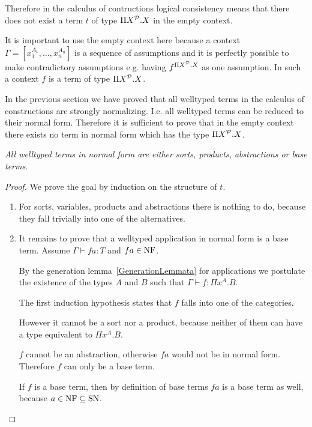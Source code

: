 Therefore in the calculus of contructions logical consistency means that there
does not exist a term $t$ of type $\Pi X^{\cal P}. X$ in the empty context.

It is important to use the empty context here because a context $\Gamma =
[x_1^{A_1}, \ldots, x_n^{A_n}]$ is a sequence of assumptions and it is perfectly
possible to make contradictory assumptions e.g. having $f^{\Pi X^{\cal P}. X}$ as
one assumption. In such a context $f$ is a term of type $\Pi X^{\cal P}. X$.

In the previous section we have proved that all welltyped terms in the calculus
of constructions are strongly normalizing. I.e. all welltyped terms can be
reduced to their normal form. Therefore it is sufficient to prove that in the
empty context there exists no term in normal form which has the type $\Pi
X^{\cal P}. X$.



\begin{lemma}
    \label{NormalWelltypedTerms}
    \emph{All welltyped terms in normal form are either sorts, products,
    abstractions or base terms}.
    \begin{proof}
        We prove the goal by induction on the structure of $t$.

        \begin{enumerate}
            \item For sorts, variables, products and abstractions there is
                nothing to do, because they fall trivially into one of the
                alternatives.

            \item It remains to prove that a welltyped application in normal
                form is a base term. Assume $\Gamma \vdash fa : T$ and $fa \in
                \text{NF}$.

                By the generation lemma~\ref{GenerationLemmata} for applications
                we postulate the existence of the types $A$ and $B$ such that
                $\Gamma \vdash f: \Pi x^A. B$.

                The first induction hypothesis states that $f$ falls into one of
                the categories.

                However it cannot be a sort nor a product,
                because neither of them can have a type equivalent to $\Pi
                x^A.B$.

                $f$ cannot be an abstraction, otherwise $fa$ would not
                be in normal form. Therefore $f$ can only be a base term.

                If $f$ is a base term, then by definition of base terms $fa$ is
                a base term as well, because $a\in\text{NF} \subseteq \text{SN}$.
        \end{enumerate}
    \end{proof}
\end{lemma}



